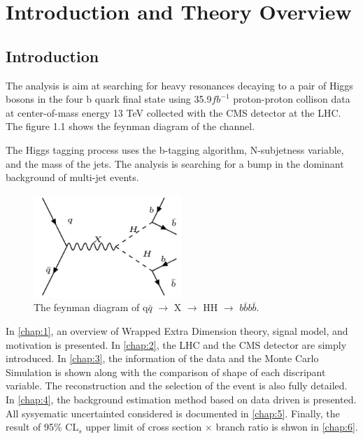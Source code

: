 \chapter{Introduction and Theory Overview} \label{chap:1}

\section{Introduction}
The analysis is aim at searching for heavy resonances decaying to a pair of Higgs
bosons in the four b quark final state using 35.9$fb^{-1}$ proton-proton collison data at center-of-mass energy 13 TeV collected with the CMS detector at the LHC. The figure 1.1 shows the feynman diagram of the channel. 

The Higgs tagging process uses the b-tagging algorithm, N-subjetness variable, and the mass of the jets. The analysis is searching for a bump in the dominant background of multi-jet events.


\begin{figure}[t]
  \begin{center}

    \includegraphics[width=0.5\textwidth]{Figures/Screenshot_20170601_160641.pdf} 
    \end{center}
  \caption{The feynman diagram of q$\bar{q}$ $\rightarrow$ X $\rightarrow$ HH $\rightarrow$ $b\bar{b}b\bar{b}$.}
\end{figure}

In \autoref{chap:1}, an overview of Wrapped Extra Dimension theory, signal model, and motivation is presented. In \autoref{chap:2}, the LHC and the CMS detector are simply introduced. In \autoref{chap:3}, the information of the data and the Monte Carlo Simulation is shown along with the comparison of shape of each discripant variable. The reconstruction and the selection of the event is also fully detailed. In \autoref{chap:4}, the background estimation method based on data driven is presented. All sysyematic uncertainted considered is documented in \autoref{chap:5}. Finally, the result of 95$\% $ CL$_{s}$ upper limit of cross section $\times$ branch ratio is shwon in \autoref{chap:6}. 

